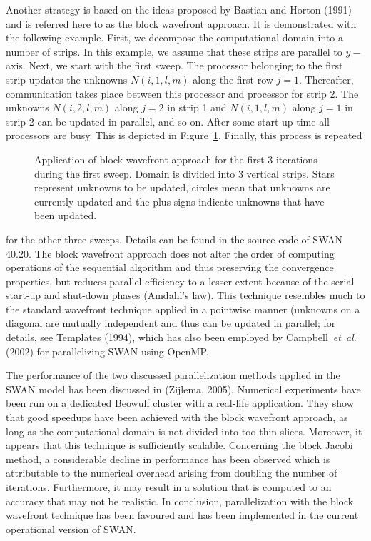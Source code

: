 \documentclass[12pt]{book}
\begin{document}
Another strategy is based on the ideas proposed by Bastian and Horton (1991) and is
referred here to as the block wavefront approach. It is demonstrated with the following
example. First, we decompose the computational domain into a number of strips. In this
example, we assume that these strips are parallel to $y-$axis. Next, we start with the
first sweep. The processor belonging to the first strip updates the unknowns $N(i,1,l,m)$
along the first row $j=1$. Thereafter, communication takes place between this processor and
processor for strip 2. The unknowns $N(i,2,l,m)$ along $j=2$ in strip 1 and $N(i,1,l,m)$ along
$j=1$ in strip 2 can be updated in parallel, and so on. After some start-up time all processors
are busy. This is depicted in Figure~\ref{fig:wfront}. Finally, this process is repeated
\begin{figure}[htb]
   \centerline{
              }
      \caption{Application of block wavefront approach for the first 3 iterations during the
               first sweep. Domain is divided into 3 vertical strips. Stars represent unknowns
               to be updated, circles mean that unknowns are currently updated and the plus
               signs indicate unknowns that have been updated.}
      \label{fig:wfront}
\end{figure}
for the other three sweeps. Details can be found in the source code of SWAN 40.20. The block
wavefront approach does not alter the order of computing operations of the sequential algorithm
and thus preserving the convergence properties, but reduces parallel efficiency to a lesser
extent because of the serial start-up and shut-down phases (Amdahl's law). This technique
resembles much to the standard wavefront technique applied in a pointwise manner (unknowns on
a diagonal are mutually independent and thus can be updated in parallel; for details, see
Templates (1994), which has also been employed by Campbell~{\it et~al}. (2002) for
parallelizing SWAN using OpenMP.
\nocite{Templates94,Cam02R}

The performance of the two discussed parallelization methods applied in the SWAN model has been
discussed in (Zijlema, 2005).
Numerical experiments have been run on a dedicated Beowulf cluster with a real-life application.
They show that good speedups have been achieved with the
block wavefront approach, as long as the computational domain is not divided into too thin slices. Moreover,
it appears that this technique is sufficiently scalable. Concerning the block Jacobi method, a considerable
decline in performance has been observed which is attributable to the numerical overhead arising from doubling
the number of iterations. Furthermore, it may result in a solution that is computed to an accuracy that may not
be realistic. In conclusion, parallelization with the block wavefront technique has been favoured and has been
implemented in the current operational version of SWAN.
\end{document}
